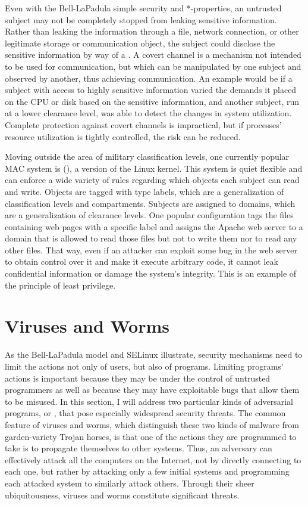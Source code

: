 Even with the Bell-LaPadula simple security and *-properties, an
untrusted subject may not be completely stopped from leaking sensitive
information.  Rather than leaking the information through a file,
network connection, or other legitimate storage or communication
object, the subject could disclose the sensitive information by way of
a .  A covert channel is a mechanism not
intended to be used for communication, but which can be manipulated by
one subject and observed by another, thus achieving communication.  An
example would be if a subject with access to highly sensitive
information varied the demands it placed on the CPU or disk based on
the sensitive information, and another subject, run at a lower
clearance level, was able to detect the changes in system utilization.
Complete protection against covert channels is impractical, but if
processes' resource utilization is tightly controlled, the risk can be
reduced.

Moving outside the area of military classification levels, one
currently popular MAC system is 
(), a version of the Linux kernel.  This system is
quiet flexible and can enforce a wide variety of rules regarding
which objects each subject can read and write.  Objects are tagged
with type labels, which are a generalization of classification levels
and compartments.  Subjects are assigned to domains, which are a
generalization of clearance levels.  One popular configuration tags
the files containing web pages with a specific label and assigns the
Apache web server to a domain that is allowed to read those files but
not to write them nor to read any other files.  That way, even if an
attacker can exploit some bug in the web server to obtain control over
it and make it execute arbitrary code, it cannot leak confidential
information or damage the system's integrity.  This is an example of
the principle of least privilege.

\section{Viruses and Worms}\label{viruses-and-worms-section}

As the Bell-LaPadula model and SELinux illustrate, security mechanisms need to
limit the actions not only of users, but also of programs.  Limiting
programs' actions is important because they may be under the control
of untrusted programmers as well as because they may have exploitable
bugs that allow them to be misused.
In this section, I will address two
particular kinds of adversarial programs, or , that
pose especially widespread security threats.  The common feature of
viruses and worms, which distinguish these two kinds of malware from
garden-variety Trojan horses, is that one of the actions they are
programmed to take is to propagate themselves to other systems.  Thus,
an adversary can effectively attack all the computers on the Internet,
not by directly connecting to each one, but rather by attacking only a
few initial systems and programming each attacked system to similarly
attack others.  Through their sheer ubiquitousness, viruses and worms
constitute significant threats.

